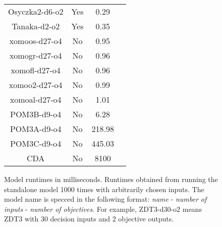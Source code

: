 \documentclass[10pt,journal,cspaper,compsoc]{IEEEtran}
\begin{document}
\begin{figure}
\begin{center}
\begin{tabular}{|c	|	c	|	c	|	c	|}
Osyczka2-d6-o2	&	Yes	&	0.29	&	\cite{osymodel} 	\\	
Tanaka-d2-o2  	&	Yes	&	0.35	&	\cite{537993} 	\\	
xomoos-d27-o4 	&	No	&	0.95	&	\cite{Zitzler2000zdtpaper} 	\\	
xomogr-d27-o4 	&	No	&	0.96	&		\\	
xomofl-d27-o4 	&	No	&	0.96	&		\\	
xomoo2-d27-o4 	&	No	&	0.99	&		\\	
xomoal-d27-o4 	&	No	&	1.01	&		\\	
POM3B-d9-o4   	&	No	&	6.28	&	\cite{port08,me09j}	\\	
POM3A-d9-o4   	&	No	&	218.98	&	\cite{port08,me09j}	\\	
POM3C-d9-o4   	&	No	&	445.03	&	\cite{port08,me09j}	\\	
CDA	&	No	&	8100	&	\cite{Kim2011,Pritchett2011,Feigh2012,Kim2013,Pritchett2013}	\\	\hline
\end{tabular}		
\end{center}
\label{modelruntimes}	
\caption{Model runtimes in milliseconds.  Runtimes obtained from running the standalone model 1000 times with arbitrarily chosen inputs.  The model name is specced in the following format:  \emph{name} - \emph{number of inputs} - \emph{number of objectives}.  For example, ZDT3-d30-o2 means ZDT3 with 30 decision inputs and 2 objective outputs.}
						
\end{figure} 
\end{document}
